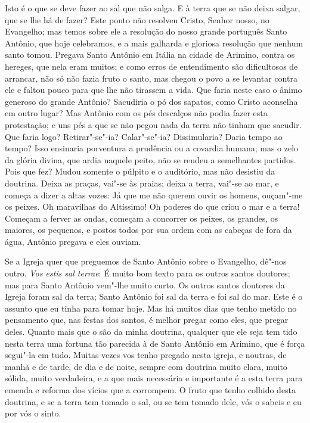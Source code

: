 Isto é o que se deve fazer ao sal que não salga. E à terra que se não
deixa salgar, que se lhe há de fazer? Este ponto não resolveu Cristo,
Senhor nosso, no Evangelho; mas temos sobre ele a resolução do nosso
grande português Santo Antônio, que hoje celebramos, e a mais galharda e
gloriosa resolução que nenhum santo tomou.
Pregava Santo Antônio em Itália na cidade de Arimino, contra os hereges,
que nela eram muitos; e como erros de entendimento são dificultosos de
arrancar, não só não fazia fruto o santo, mas chegou o povo a se
levantar contra ele e faltou pouco para que lhe não tirassem a vida. Que
faria neste caso o ânimo generoso do grande Antônio? Sacudiria o pó dos
sapatos, como Cristo aconselha em outro lugar? Mas Antônio com os pés
descalços não podia fazer esta protestação; e uns pés a que se não pegou
nada da terra não tinham que sacudir. Que faria logo? Retirar"-se"-ia?
Calar"-se"-ia? Dissimularia? Daria tempo ao tempo? Isso ensinaria
porventura a prudência ou a covardia humana; mas o zelo da glória
divina, que ardia naquele
peito, não se rendeu a semelhantes partidos. Pois que fez? Mudou somente
o púlpito e o auditório, mas não desistiu da doutrina. Deixa as praças,
vai"-se às praias; deixa a terra, vai"-se ao mar, e começa a dizer a altas
vozes: Já que me não querem ouvir os homens, ouçam"-me os peixes. Oh
maravilhas do Altíssimo! Oh poderes do que criou o mar e a terra!
Começam a ferver as ondas, começam a concorrer os peixes, os grandes, os
maiores, os pequenos, e postos todos por sua ordem com as cabeças de
fora da água, Antônio pregava e eles ouviam.

Se a Igreja quer que preguemos de Santo Antônio sobre o Evangelho,
dê"-nos outro. \emph{Vos estis sal terrae}: É muito bom texto para os
outros santos doutores; mas para Santo Antônio vem"-lhe muito curto. Os
outros santos doutores da Igreja foram sal da terra; Santo Antônio foi
sal da terra e foi sal do mar. Este é o assunto que eu tinha para tomar
hoje. Mas há muitos dias que tenho metido no pensamento que, nas festas
dos santos, é melhor pregar como eles, que pregar deles. Quanto mais que
o são da minha doutrina, qualquer que ele seja tem tido nesta terra uma
fortuna tão parecida à de Santo Antônio em Arimino, que é força segui"-la
em tudo. Muitas vezes vos tenho pregado nesta igreja, e noutras, de
manhã e de tarde, de dia e de noite, sempre com doutrina muito clara,
muito sólida, muito verdadeira, e a que mais necessária e importante é a
esta terra para emenda e reforma dos vícios que a corrompem. O fruto que
tenho colhido desta doutrina, e se a terra tem tomado o sal, ou se tem
tomado dele, vós o sabeis e eu por vós o sinto.

